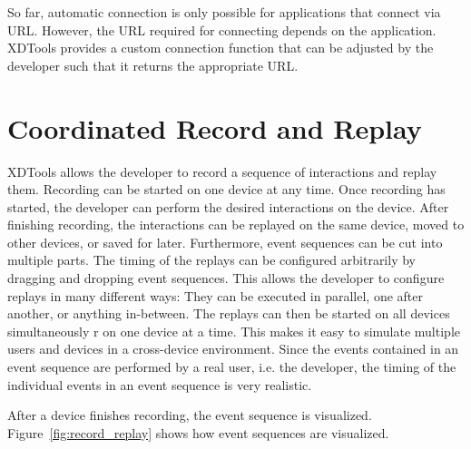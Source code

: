 So far, automatic connection is only possible for applications that connect via URL. However, the URL required for connecting depends on the application. XDTools provides a custom connection function that can be adjusted by the developer such that it returns the appropriate URL.

\section{Coordinated Record and Replay}

XDTools allows the developer to record a sequence of interactions and replay them. Recording can be started on one device at any time. Once recording has started, the developer can perform the desired interactions on the device. After finishing recording, the interactions can be replayed on the same device, moved to other devices, or saved for later.  Furthermore, event sequences can be cut into multiple parts. The timing of the replays can be configured arbitrarily by dragging and dropping event sequences. This allows the developer to configure replays in many different ways: They can be executed in parallel, one after another, or anything in-between. The replays can then be started on all devices simultaneously r on one device at a time. This makes it easy to simulate multiple users and devices in a cross-device environment. Since the events contained in an event sequence are performed by a real user, i.e. the developer, the timing of the individual events in an event sequence is very realistic.

After a device finishes recording, the event sequence is visualized. Figure~\ref{fig:record_replay} shows how event sequences are visualized.

